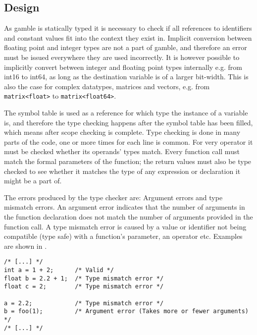 \subsection*{Design}
As \gls{gamble} is statically typed it is necessary to check if all references to identifiers and constant values fit into the context they exist in. 
Implicit conversion between floating point and integer types are not a part of \gls{gamble}, and therefore an error must be issued everywhere they are used incorrectly. 
It is however possible to implicitly convert between integer and floating point types internally e.g. from int16 to int64, as long as the destination variable is of a larger bit-width.
This is also the case for complex datatypes, matrices and vectors, e.g. from \texttt{matrix<float>} to \texttt{matrix<float64>}. 

The symbol table is used as a reference for which type the instance of a variable is, and therefore the type checking happens after the symbol table has been filled, which means after scope checking is complete. 
Type checking is done in many parts of the code, one or more times for each line is common. 
For very operator it must be checked whether its operands' types match.
Every function call must match the formal parameters of the function; the return values must also be type checked to see whether it matches the type of any expression or declaration it might be a part of.

The errors produced by the type checker are: Argument errors and type mismatch errors.
An argument error indicates that the number of arguments in the function declaration does not match the number of arguments provided in the function call.
A type mismatch error is caused by a value or identifier not being compatible (type safe) with a function's parameter, an operator etc. 
Examples are shown in .

\begin{lstlisting}[caption=Examples of type errors in \gls{gamble},numbers=none,frame=tlrb,label={lst:typeErrors}]
/* [...] */
int a = 1 + 2;      /* Valid */
float b = 2.2 + 1;  /* Type mismatch error */
float c = 2;        /* Type mismatch error */

a = 2.2;            /* Type mismatch error */
b = foo(1);         /* Argument error (Takes more or fewer arguments) */ 
/* [...] */
\end{lstlisting}

